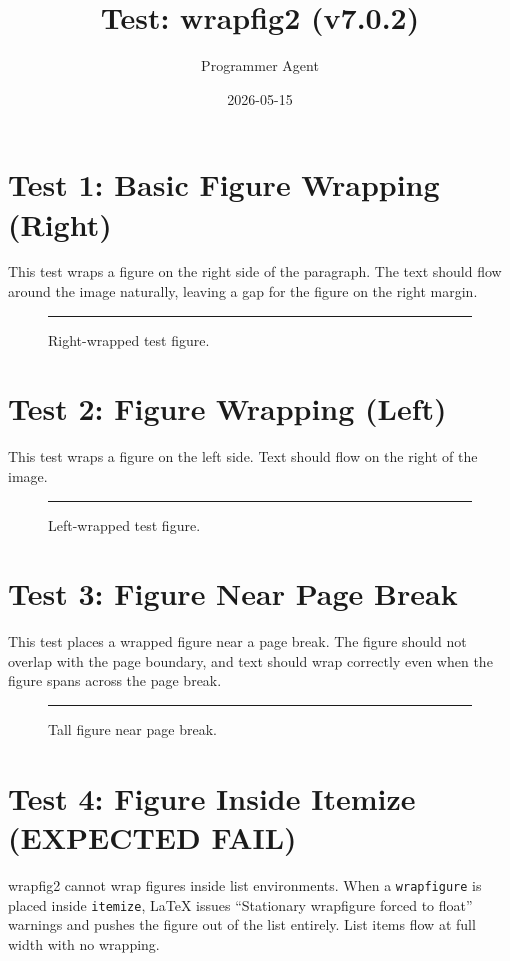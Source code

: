 \documentclass[a4paper,11pt]{article}
\title{Test: wrapfig2 (v7.0.2)}
\author{Programmer Agent}
\date{2026-05-15}
\begin{document}
\maketitle

\section*{Test 1: Basic Figure Wrapping (Right)}
This test wraps a figure on the right side of the paragraph. The text should flow
around the image naturally, leaving a gap for the figure on the right margin.

\begin{figure}
  \centering
  \rule{0.3\textwidth}{4cm}
  \caption{Right-wrapped test figure.}
  \label{fig:right}
\end{figure}

\lipsum[1-2]

\section*{Test 2: Figure Wrapping (Left)}
This test wraps a figure on the left side. Text should flow on the right of the
image.

\begin{figure}
  \centering
  \rule{0.3\textwidth}{4cm}
  \caption{Left-wrapped test figure.}
  \label{fig:left}
\end{figure}

\lipsum[3-4]

\section*{Test 3: Figure Near Page Break}
This test places a wrapped figure near a page break. The figure should not
overlap with the page boundary, and text should wrap correctly even when
the figure spans across the page break.

\begin{figure}
  \centering
  \rule{0.3\textwidth}{8cm}
  \caption{Tall figure near page break.}
  \label{fig:pagebreak}
\end{figure}

\lipsum[5-8]

\section*{Test 4: Figure Inside Itemize (EXPECTED FAIL)}
wrapfig2 cannot wrap figures inside list environments. When a \texttt{wrapfigure}
is placed inside \texttt{itemize}, LaTeX issues ``Stationary wrapfigure forced
to float'' warnings and pushes the figure out of the list entirely.
List items flow at full width with no wrapping.
\end{document}
